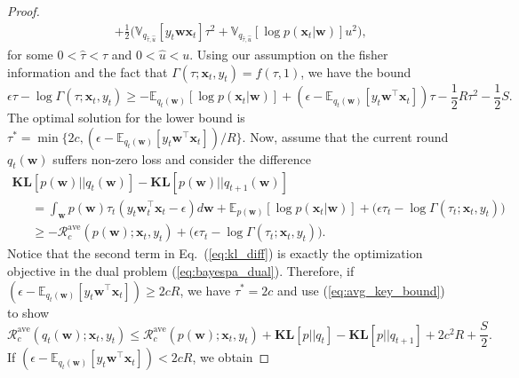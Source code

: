 \documentclass[twoside,11pt]{article}
\newcommand{\xv}{\bm{x}}
\newcommand{\regret}{\mathcal{R}}
\newcommand{\wv}{\bm{w}}
\newcommand{\eat}[1]{}
\newcommand{\ep}{\mathbb{E}}
\newcommand{\KL}{\textbf{KL}}
\newcommand{\var}{\mathbb{V}}
\newcommand{\E}{\mathbb{E}}
\begin{document}
{\begin{proof}
\begin{eqnarray}
&& +\frac{1}{2} \Big(\var_{q_{\hat{\tau}, \hat{u}}}\left[y_t \wv \xv_t\right] \tau^2+\var_{q_{\hat{\tau}, \hat{u}}}\left[\log p(\xv_t | \wv)\right] u^2\Big), \nonumber
\end{eqnarray}
for some $0 < \hat{\tau} < \tau$ and $0 < \hat{u} < u$. Using our assumption on the fisher information and the fact that $\Gamma(\tau; \xv_t, y_t) = f(\tau, 1)$, we have the bound
\begin{equation} \label{eq:avg_key_bound}
\epsilon \tau - \log \Gamma(\tau; \xv_t, y_t) \geq -\ep_{q_t(\wv)} \left[\log p(\xv_t | \wv) \right]+\left( \epsilon-\E_{q_{t}(\wv)}\left[ y_t \wv^\top \xv_t \right] \right) \tau - \frac{1}{2} R \tau^2-\frac{1}{2} S.
\end{equation}
The optimal solution for the lower bound is $\tau^* = \min\{2c, (\epsilon-\E_{q_{t}(\wv)}[y_t \wv^\top \xv_t])/R\}$. Now, assume that the current round $q_t(\wv)$ suffers non-zero loss and consider the difference
\begin{equation}
\begin{array}{l}
\KL\left[p(\wv) || q_t(\wv)\right]-\KL\left[p(\wv) || q_{t+1}(\wv)\right]  \\
~~~~~~~ = \int_{\wv}{p(\wv) \tau_t\left( y_t \wv_t^\top \xv_t-\epsilon \right) d\wv}+\ep_{p(\wv)}[\log p(\xv_t | \wv)]+\Big(\epsilon \tau_t-\log \Gamma(\tau_t; \xv_t, y_t) \Big) \\
~~~~~~~ \geq -\regret_{c}^\text{ave}(p(\wv); \xv_t, y_t)+\Big(\epsilon \tau_t-\log \Gamma(\tau_t; \xv_t, y_t) \Big). \label{eq:kl_diff}
 \end{array}
\end{equation}
Notice that the second term in Eq.~(\ref{eq:kl_diff}) is exactly the optimization objective in the dual problem (\ref{eq:bayespa_dual}). Therefore, if $(\epsilon-\E_{q_{t}(\wv)}[y_t \wv^\top \xv_t]) \geq 2cR$, we have $\tau^* = 2c$ and use (\ref{eq:avg_key_bound}) to show
\begin{equation*}
\regret_c^\text{ave}(q_t(\wv); \xv_t, y_t) \leq \regret_{c}^\text{ave}(p(\wv); \xv_t, y_t)+ \KL[p || q_t]-\KL[p || q_{t+1}] +2 c^2 R + \frac{S}{2}.
\end{equation*}
If $(\epsilon-\E_{q_{t}(\wv)}[y_t \wv^\top \xv_t]) < 2cR$, we obtain

\eat{
bound on the squared loss
\begin{equation*}
\Big(\ell^\text{ave}_\epsilon(\xv_t)\Big)^2 \leq 2 \Big( \ell^*_\epsilon(\xv_t)+\frac{1}{c}(\KL[p || q_t]-\KL[p || q_{t+1}]) \Big) c R;
\end{equation*}
To unify the above two bounds, we can further simplify using the geometric inequality,
}


\end{proof}}
\end{document}
